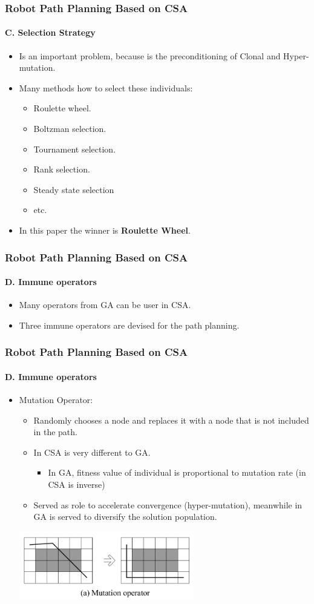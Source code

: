 \frame
{
\frametitle{Robot Path Planning Based on CSA}
\framesubtitle{C. Selection Strategy}
\begin{itemize}
	\item Is an important problem, because is the preconditioning of Clonal and Hyper-mutation.
	\item Many methods how to select these individuals:
	\begin{itemize}
		\item Roulette wheel.
		\item Boltzman selection.
		\item Tournament selection.
		\item Rank selection.
		\item Steady state selection
		\item etc.
	\end{itemize}
	\item In this paper the winner is \textbf{Roulette Wheel}.
\end{itemize}
}

\frame
{
\frametitle{Robot Path Planning Based on CSA}
\framesubtitle{D. Immune operators}
\begin{itemize}
	\item Many operators from GA can be user in CSA.
	\item Three immune operators are devised for the path planning. 
\end{itemize}
}

\frame
{
\frametitle{Robot Path Planning Based on CSA}
\framesubtitle{D. Immune operators}
\begin{itemize}
	\item Mutation Operator:
	\begin{itemize}
		\item Randomly chooses a node and replaces it with a node that is not included in the path.
		\item In CSA is very different to GA.
		\begin{itemize}
			\item In GA, fitness value of individual is proportional to mutation rate (in CSA is inverse)
		\end{itemize}
		\item Served as role to accelerate convergence (hyper-mutation), meanwhile in GA is served to diversify the solution population.
	\end{itemize}

	\begin{center}
		\includegraphics[width=0.6\textwidth]{img/mutation}
	\end{center}
\end{itemize}
}

